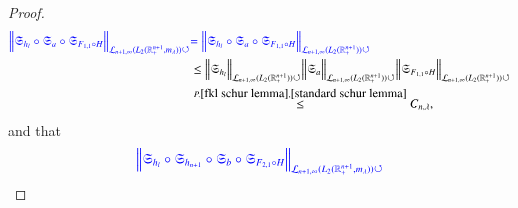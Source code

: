 \documentclass[12pt]{amsart}
\begin{document}
\begin{proof}
\begin{align*}
{\color{blue}\Big\|\mathfrak{S}_{h_l}\circ\mathfrak{S}_a\circ\mathfrak{S}_{F_{1,1}\circ H}\Big\|_{\mathcal{L}_{n+1,\infty}(L_2(\mathbb{R}^{n+1}_+,m_{\lambda}))\circlearrowleft}}
&{\color{blue}=\Big\|\mathfrak{S}_{h_l}\circ\mathfrak{S}_a\circ\mathfrak{S}_{F_{1,1}\circ H}\Big\|_{\mathcal{L}_{n+1,\infty}(L_2(\mathbb{R}^{n+1}_+))\circlearrowleft}}\\
&\leq \Big\|\mathfrak{S}_{h_l}\Big\|_{\mathcal{L}_{n+1,\infty}(L_2(\mathbb{R}^{n+1}_+))\circlearrowleft} \Big\|\mathfrak{S}_a\Big\|_{\mathcal{L}_{n+1,\infty}(L_2(\mathbb{R}^{n+1}_+))\circlearrowleft} \Big\|\mathfrak{S}_{F_{1,1}\circ H}\Big\|_{\mathcal{L}_{n+1,\infty}(L_2(\mathbb{R}^{n+1}_+))\circlearrowleft}\\
&\stackrel{P.\ref{fkl schur lemma},\ref{standard schur lemma}}{\leq}{C_{n,\lambda}},
\end{align*}
and that
\begin{align*}
{\color{blue}\Big\|\mathfrak{S}_{h_l}\circ\mathfrak{S}_{h_{n+1}}\circ\mathfrak{S}_b\circ\mathfrak{S}_{F_{2,1}\circ H}\Big\|_{\mathcal{L}_{n+1,\infty}(L_2(\mathbb{R}^{n+1}_+,m_{\lambda}))\circlearrowleft}}

\end{align*}
\end{proof}
\end{document}
